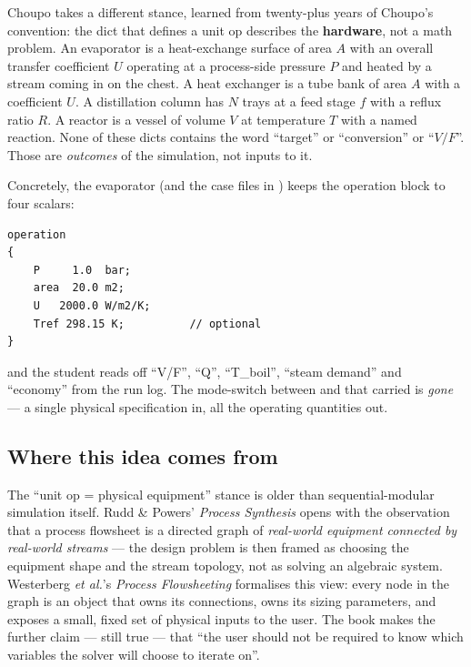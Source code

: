\documentclass[11pt,a4paper]{article}
\begin{document}
Choupo takes a different stance, learned from twenty-plus years of
Choupo's convention: the dict that defines a unit op describes
the \textbf{hardware}, not a math problem.  An evaporator is a
heat-exchange surface of area $A$ with an overall transfer
coefficient $U$ operating at a process-side pressure $P$ and
heated by a stream coming in on the chest.  A heat exchanger is a
tube bank of area $A$ with a coefficient $U$.  A distillation
column has $N$ trays at a feed stage $f$ with a reflux ratio $R$.
A reactor is a vessel of volume $V$ at temperature $T$ with a
named reaction.  None of these dicts contains the word ``target''
or ``conversion'' or ``$V/F$''.  Those are \emph{outcomes} of the
simulation, not inputs to it.

Concretely, the evaporator (and the case files in
) keeps the operation block
to four scalars:

\begin{verbatim}
operation
{
    P     1.0  bar;
    area  20.0 m2;
    U   2000.0 W/m2/K;
    Tref 298.15 K;          // optional
}
\end{verbatim}

\noindent and the student reads off ``V/F'', ``Q'', ``T\_boil'',
``steam demand'' and ``economy'' from the run log.  The
mode-switch between  and  that carried is \emph{gone} --- a single physical specification
in, all the operating quantities out.

\subsection{Where this idea comes from}

The ``unit op = physical equipment'' stance is older than
sequential-modular simulation itself.  Rudd \& Powers'
\emph{Process Synthesis} \cite{RuddPowers1973} opens with the
observation that a process flowsheet is a directed graph of
\emph{real-world equipment connected by real-world streams} ---
the design problem is then framed as choosing the equipment
shape and the stream topology, not as solving an algebraic
system.  Westerberg \emph{et al.}'s \emph{Process Flowsheeting}
\cite{Westerberg1979} formalises this view: every node in the
graph is an object that owns its connections, owns its sizing
parameters, and exposes a small, fixed set of physical inputs
to the user.  The book makes the further claim --- still true ---
that ``the user should not be required to know which variables
the solver will choose to iterate on''.
\end{document}
